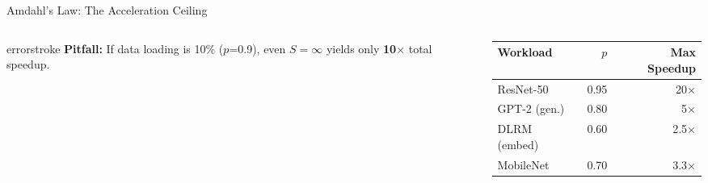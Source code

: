 \documentclass[aspectratio=169, 12pt]{beamer}
\begin{document}
\begin{frame}{Amdahl's Law: The Acceleration Ceiling}
\begin{columns}[T]
\begin{column}{0.50\textwidth}
    \vspace{0.1cm}
    \begin{mlsyscard}{errorstroke}
    {\scriptsize \textbf{Pitfall:} If data loading is 10\% ($p$=0.9), even $S\!=\!\infty$ yields only \textbf{10$\times$} total speedup.}
    \end{mlsyscard}
  \end{column}
  \begin{column}{0.46\textwidth}
    \renewcommand{\arraystretch}{1.1}
    {\scriptsize
    \begin{tabular}{@{}lrr@{}}
      \toprule
      \textbf{Workload} & \textbf{$p$} & \textbf{Max Speedup} \\
      \midrule
      ResNet-50       & 0.95 & 20$\times$ \\
      GPT-2 (gen.)    & 0.80 & 5$\times$ \\
      DLRM (embed)    & 0.60 & 2.5$\times$ \\
      MobileNet       & 0.70 & 3.3$\times$ \\
      \bottomrule
    \end{tabular}
    }

    \vspace{0.1cm}
    {\scriptsize{}}
  \end{column}
\end{columns}

\end{frame}
\end{document}
